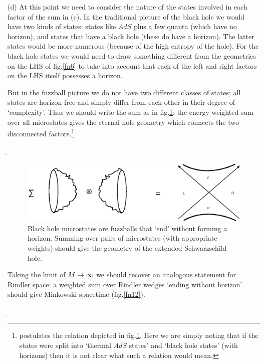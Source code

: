 \documentclass[12pt]{article}
\begin{document}
(d) At this point we need to consider the  nature of the states involved in each factor of the sum in (c). In the traditional picture of the black hole we would have two kinds of states: states like $AdS$  plus a few  quanta (which have no horizon), and states that have a black hole (these do have a horizon). The latter states would be more numerous (because of the high entropy of the hole).  For the black hole states we would need to draw something different from the geometries  on the LHS of  fig.\ref{fn6} to take into account that each of the left and right factors on the LHS itself possesses a horizon.  

But in the fuzzball picture we do not have two different classes of states; all states are horizon-free and simply differ from each other in their degree of `complexity'. Thus we should write the sum as in fig.\ref{fn7}: the energy weighted sum over all microstates gives the eternal hole geometry which connects the two disconnected factors.\footnote{\cite{raamsdonk}  postulates the relation depicted in fig.\ref{fn7}. Here we are simply noting that if the states were split into `thermal $AdS$ states' and `black hole states' (with horizons) then it is not clear what such a relation would mean.}

\b

\begin{figure}[htbp]
\begin{center}
\includegraphics[scale=.85]{fn7.eps}
\caption{{Black hole microstates are fuzzballs that `end' without forming a horizon. Summing over pairs of microstates (with appropriate weights) should give the geometry of the extended Schwarzschild hole.}}
\label{fn7}
\end{center}
\end{figure}

Taking the limit of $M\rightarrow\infty$ we should recover an analogous statement for Rindler space: a weighted sum over Rindler wedges `ending without horizon' should give Minkowski spacetime (fig.\ref{fn12}). 

\b
\end{document}
